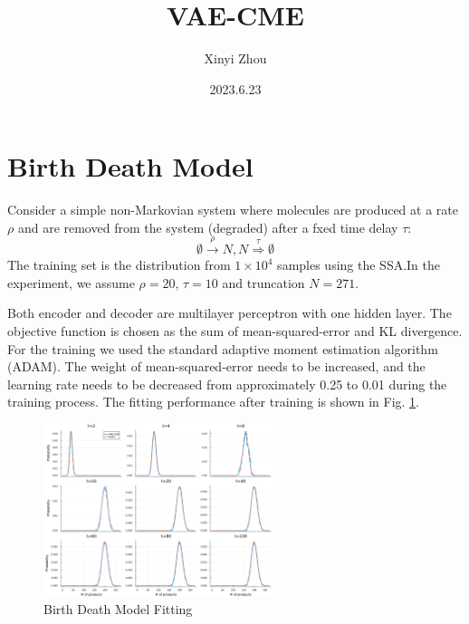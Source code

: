 \documentclass[a4paper,10pt]{article}
\title{VAE-CME}
\author{Xinyi Zhou}
\date{2023.6.23}
\begin{document}
\tableofcontents
\maketitle

\section{Birth Death Model}
Consider a simple non-Markovian system where molecules are produced at a rate $\rho$ and are removed from the system (degraded) after a fxed time delay $\tau$:
\begin{equation}\label{birth-death}
\emptyset\stackrel{\rho}\rightarrow N, N\stackrel{\tau}\Rightarrow\emptyset
\end{equation}
The training set is the distribution from $1 \times 10^4$ samples using the SSA.In the experiment, we assume $\rho=20$, $\tau=10$ and truncation $N=271$. 

Both encoder and decoder are multilayer perceptron with one hidden layer. The objective function is chosen as the sum of mean-squared-error and KL divergence. For the training we used the standard adaptive moment estimation algorithm (ADAM). The weight of mean-squared-error needs to be increased, and the learning rate needs to be decreased from approximately 0.25 to 0.01 during the training process. The fitting performance after training is shown in Fig. \ref{Birth Death Model Fitting}.

\begin{figure}[h]
	\centering
	\includegraphics[width=0.6\textwidth]{Figs/Birth_Death_fitting.pdf}
	\caption{Birth Death Model Fitting}\label{Birth Death Model Fitting}  
\end{figure}
\end{document}
